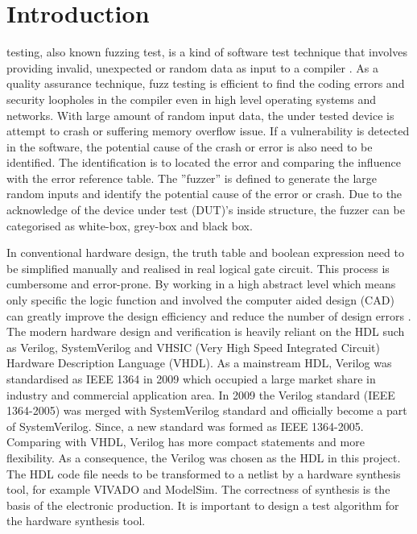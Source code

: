 \chapter{Introduction}
\renewcommand{\baselinestretch}{\mystretch}
\label{chap:Intro}

 testing, also known fuzzing test, is a kind of software test technique that involves providing invalid, unexpected or random data as input to a compiler \cite{miller2007fuzz}. As a quality assurance technique, fuzz testing is efficient to find the coding errors and security loopholes in the compiler even in high level operating systems and networks. With large amount of random input data, the under tested device is attempt to crash or suffering memory overflow issue. If a vulnerability is detected in the software, the potential cause of the crash or error is also need to be identified. The identification is to located the error and comparing the influence with the error reference table. The ''fuzzer'' is defined to generate the large random inputs and identify the potential cause of the error or crash. Due to the acknowledge of the device under test (DUT)'s inside structure, the fuzzer can be categorised as white-box, grey-box and black box.

In conventional hardware design, the truth table and boolean expression need to be simplified manually and realised in real logical gate circuit. This process is cumbersome and error-prone. By working in a high abstract level which means only specific the logic function and involved the computer aided design (CAD) can greatly improve the design efficiency and reduce the number of design errors \cite{harris2015digital}. 
The modern hardware design and verification is heavily reliant on the HDL such as Verilog, SystemVerilog and VHSIC (Very High Speed Integrated Circuit) Hardware Description Language (VHDL). As a mainstream HDL, Verilog was standardised as IEEE 1364 in 2009 \cite{1620780} which occupied a large market share in industry and commercial application area. In 2009 the Verilog standard (IEEE 1364-2005) was merged with SystemVerilog standard and officially become a part of SystemVerilog. Since, a new standard was formed as IEEE 1364-2005. Comparing with VHDL, Verilog has more compact statements and more flexibility. As a consequence, the Verilog was chosen as the HDL in this project. The HDL code file needs to be transformed to a netlist by a hardware synthesis tool, for example VIVADO and ModelSim. The correctness of synthesis is the basis of the electronic production. It is important to design a test algorithm for the hardware synthesis tool.

